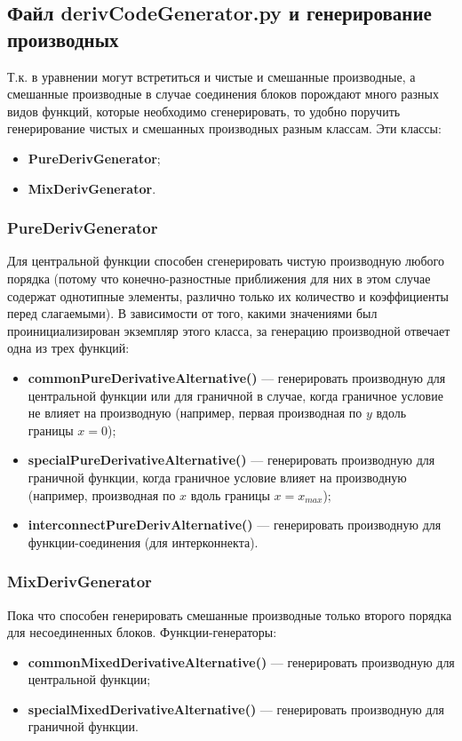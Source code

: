 \documentclass[a4paper]{article}
\begin{document}
\newpage
\subsection{\Large Файл derivCodeGenerator.py и генерирование производных}
Т.к. в уравнении могут встретиться и чистые и смешанные производные, а смешанные производные в случае соединения блоков порождают много разных видов функций, которые необходимо сгенерировать, то удобно поручить генерирование чистых и смешанных производных разным клас\-сам. Эти классы:
\begin{itemize}
\item {\bf PureDerivGenerator};
\item {\bf MixDerivGenerator}.
\end{itemize}

\subsubsection{\large PureDerivGenerator}
Для центральной функции способен сгенерировать чистую производную любого порядка (потому что конечно-разностные приближения для них в этом случае содержат однотипные элементы, различно только их ко\-ли\-че\-ство и коэффициенты перед слагаемыми). В зависимости от того, какими значениями был проинициализирован экземпляр этого класса, за генерацию производной отвечает одна из трех функций:
\begin{itemize}
\item {\bf commonPureDerivativeAlternative()} --- генерировать производную для центральной функции или для граничной в случае, когда гра\-нич\-ное условие не влияет на производную (например, первая про\-из\-вод\-ная по $y$ вдоль границы $x = 0$);
\item {\bf specialPureDerivativeAlternative()} --- генерировать производную для граничной функции, когда граничное условие влияет на про\-из\-вод\-ную (например, производная по $x$ вдоль границы $x = x_{max}$);
\item {\bf interconnectPureDerivAlternative()} --- генерировать производную для функции-соединения (для интерконнекта).
\end{itemize} 

\subsubsection{\large MixDerivGenerator}
Пока что способен генерировать смешанные производные только второго порядка для несоединенных блоков. Функции-генераторы:
\begin{itemize}
\item {\bf commonMixedDerivativeAlternative()} --- генерировать производную для центральной функции;
\item {\bf specialMixedDerivativeAlternative()} --- генерировать производную для граничной функции.
\end{itemize}
\end{document}
